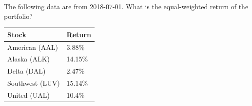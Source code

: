 The following data are from 2018-07-01. What is the equal-weighted return of the portfolio?
\begin{center}
	\begin{tabular}{l|l}
		\textbf{Stock} & \textbf{Return} \\ \hline
		American (AAL) & 3.88\% \\
		Alaska (ALK) & 14.15\% \\
		Delta (DAL) & 2.47\% \\
		Southwest (LUV) & 15.14\% \\
		United (UAL) & 10.4\%\\\hline
	\end{tabular}
\end{center}

